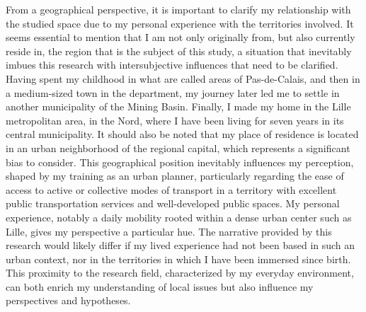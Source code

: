 \begin{refsegment}
From a geographical perspective, it is important to clarify my relationship with the studied space due to my personal experience with the territories involved. It seems essential to mention that I am not only originally from, but also currently reside in, the region that is the subject of this study, a situation that inevitably imbues this research with intersubjective influences that need to be clarified. Having spent my childhood in what are called  areas of Pas-de-Calais, and then in a medium-sized town in the department, my journey later led me to settle in another municipality of the Mining Basin. Finally, I made my home in the Lille metropolitan area, in the Nord, where I have been living for seven years in its central municipality. It should also be noted that my place of residence is located in an urban neighborhood of the regional capital, which represents a significant bias to consider. This geographical position inevitably influences my perception, shaped by my training as an urban planner, particularly regarding the ease of access to active or collective modes of transport in a territory with excellent public transportation services and well-developed public spaces. My personal experience, notably a daily mobility rooted within a dense urban center such as Lille, gives my perspective a particular hue. The narrative provided by this research would likely differ if my lived experience had not been based in such an urban context, nor in the territories in which I have been immersed since birth. This proximity to the research field, characterized by my everyday environment, can both enrich my understanding of local issues but also influence my perspectives and hypotheses.%


\end{refsegment}

